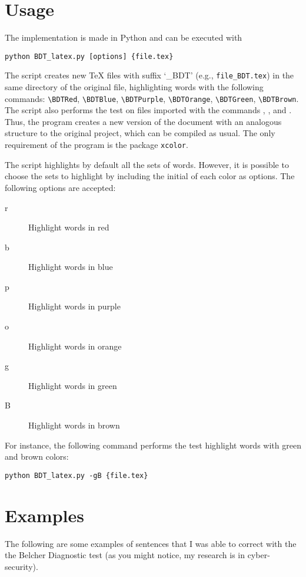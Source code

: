 \documentclass[a4paper,10pt]{article}
\newcommand{\BDTRed}[1]{{\color{red}#1}}
\newcommand{\BDTBlue}[1]{{\color{blue}#1}}
\newcommand{\BDTPurple}[1]{{\color{violet}#1}}
\newcommand{\BDTOrange}[1]{{\color{orange!50!yellow}#1}}
\newcommand{\BDTGreen}[1]{{\color{green}#1}}
\newcommand{\BDTBrown}[1]{{\color{brown!80!red}#1}}
\begin{document}
\section{Usage}

The implementation is made in Python and can be executed with
%
\begin{verbatim}
python BDT_latex.py [options] {file.tex} 
\end{verbatim}
%
The script creates new \TeX{} files with suffix `\_BDT'  (e.g.,  \verb|file_BDT.tex|) in the same directory of the original file, highlighting words with the following commands:
%
\verb|\BDTRed|,
\verb|\BDTBlue|,
\verb|\BDTPurple|,
\verb|\BDTOrange|,
\verb|\BDTGreen|,
\verb|\BDTBrown|.
%
The script also performs the test on files imported with the commands \verb||, \verb||, and \verb||.
%
Thus, the program creates a new version of the document with  an analogous structure to the original project, which can be compiled as usual.
The only requirement of the program is the package \verb|xcolor|.

The script highlights by default all the sets of words. However, it is possible to choose the sets to highlight by including the initial of each color as options. The following options are accepted:
\begin{description}
 \item[r] Highlight words in red
 \item[b] Highlight words in blue
 \item[p] Highlight words in purple
 \item[o] Highlight words in orange
 \item[g] Highlight words in green
 \item[B] Highlight words in brown
\end{description}
For instance, the following command performs the test highlight words with green and brown colors:
%
\begin{verbatim}
python BDT_latex.py -gB {file.tex} 
\end{verbatim}



\section{Examples}

The following are some examples of sentences that I was able to correct with the the Belcher Diagnostic test (as you might notice, my research is in cyber-security).  
\end{document}
